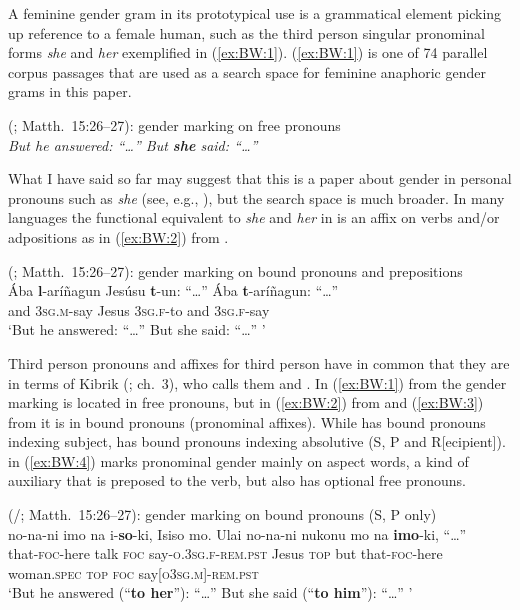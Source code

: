 \documentclass[output=collectionpaper]{langsci/langscibook}
\begin{document}
A feminine gender gram \textendash{} in its prototypical use \textendash{} is a grammatical element picking up reference to a female human, such as the  third person singular pronominal forms \textit{she} and \textit{her} exemplified in (\ref{ex:BW:1}). (\ref{ex:BW:1}) is one of 74 parallel corpus passages that are used as a search space for feminine anaphoric gender grams in this paper.

\ea\label{ex:BW:1}
 (; Matth.~15:26--27): gender marking on free pronouns\\
\textit{But he answered: ``\ldots'' But \textbf{she} said: ``\ldots''}
\z

What I have said so far may suggest that this is a paper about gender in personal pronouns such as  \textit{she} (see, e.g., \citealt{Audring2009a}), but the search space is much broader. In many languages the functional equivalent to \textit{she} and \textit{her} in  is an affix on verbs and/or adpositions as in (\ref{ex:BW:2}) from .

\ea\label{ex:BW:2}
 (; Matth.~15:26–27): gender marking on bound pronouns and prepositions\\
\gll Ába	\textbf{l}-aríñagun	Jesúsu	\textbf{t}-un:	``\ldots''	Ába	\textbf{t}-aríñagun:	``\ldots''\\
and	3\textsc{sg.m}-say	Jesus	3\textsc{sg.f}-to {}		and	3\textsc{sg.f}-say {}\\
\glt ‘But he answered: ``\ldots'' But she said: ``\ldots'' ’
\z

Third person pronouns and affixes for third person have in common that they are  in terms of Kibrik (\citeyear{Kibrik2011}; ch.~3), who calls them  and . In (\ref{ex:BW:1}) from  the gender marking is located in free pronouns, but in (\ref{ex:BW:2}) from  and (\ref{ex:BW:3}) from  it is in bound pronouns (pronominal affixes). While  has bound pronouns indexing subject,  has bound pronouns indexing absolutive (S, P and R[ecipient]).  in (\ref{ex:BW:4}) marks pronominal gender mainly on aspect words, a kind of auxiliary that is preposed to the verb, but also has optional free pronouns.

\ea\label{ex:BW:3}
 (/; Matth.~15:26–27): gender marking on bound pronouns (S, P only)\\
\gll [\ldots]	no-na-ni	imo	na	i-\textbf{so}-ki,	Isiso	mo. Ulai	no-na-ni	nukonu	mo	na	\textbf{imo}-ki,	``\ldots''\\
{} that-\textsc{foc}-here	talk \textsc{foc}	say-\textsc{o.3sg.f-rem.pst}	Jesus	\textsc{top} but	that-\textsc{foc}-here	woman.\textsc{spec}	\textsc{top}	\textsc{foc}	say[\textsc{o3sg.m}]-\textsc{rem.pst}\\
\glt ‘But he answered (``\textbf{to her}''): ``\ldots'' But she said (``\textbf{to him}''): ``\ldots'' ’
\z
\end{document}
